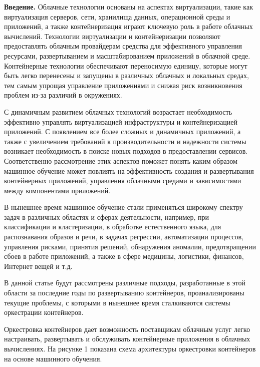 \begin{multicols}{2}
{\bfseries Введение.} Облачные технологии основаны на аспектах
виртуализации, такие как виртуализация серверов, сети, хранилища данных,
операционной среды и приложений, а также контейнеризация играют ключевую
роль в работе облачных вычислений. Технологии виртуализации и
контейнеризации позволяют предоставлять облачным провайдерам средства
для эффективного управления ресурсами, развертыванием и масштабированием
приложений в облачной среде. Контейнерные технологии обеспечивают
переносимую единицу, которые могут быть легко перенесены и запущены в
различных облачных и локальных средах, тем самым упрощая управление
приложениями и снижая риск возникновения проблем из-за различий в
окружениях.

С динамичным развитием облачных технологий возрастает необходимость
эффективно управлять виртуализацией инфраструктуры и контейнеризацией
приложений. С появлением все более сложных и динамичных приложений, а
также с увеличением требований к производительности и надежности системы
возникает необходимость в поиске новых подходов в предоставлении
сервисов. Соответственно рассмотрение этих аспектов поможет понять каким
образом машинное обучение может повлиять на эффективность создания и
развертывания контейнерных приложений, управления облачными средами и
зависимостями между компонентами приложений.

В нынешнее время машинное обучение стали применяться широкому спектру
задач в различных областях и сферах деятельности, например, при
классификации и кластеризации, в обработке естественного языка, для
распознавания образов и речи, в задачах регрессии, автоматизации
процессов, управления рисками, принятия решений, обнаружения аномалии,
предотвращении сбоев в работе приложений, а также в сфере медицины,
логистики, финансов, Интернет вещей и т.д.

В данной статье будут рассмотрены различные подходы, разработанные в
этой области за последние годы по развертыванию контейнеров,
проанализированы текущие проблемы, с которыми в нынешнее время
сталкиваются системы оркестрации контейнеров.

Оркестровка контейнеров дает возможность поставщикам облачным услуг
легко настраивать, развертывать и обслуживать контейнерные приложения в
облачных вычислениях. На рисунке 1 показана схема архитектуры
оркестровки контейнеров на основе машинного обучения.
\end{multicols}

